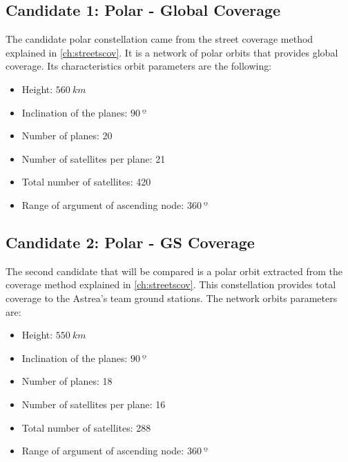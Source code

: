 

\subsection{Candidate 1: Polar - Global Coverage}

The candidate polar constellation came from the street coverage method explained in \ref{ch:streetscov}. It is a network of polar orbits that provides global coverage. Its characteristics orbit parameters are the following:

\begin{itemize}
\item Height: $560~{km}$ 
\item Inclination of the planes: $90~{º}$  
\item Number of planes: 20
\item Number of satellites per plane: 21
\item Total number of satellites: 420
\item Range of argument of ascending node: $360~{º}$ 
\end{itemize}


\subsection{Candidate 2: Polar - GS Coverage}
 
The second candidate that will be compared is a polar orbit extracted from the coverage method explained in \ref{ch:streetscov}. This constellation provides total coverage to the Astrea's team ground stations. The network orbits parameters are:

\begin{itemize}
\item Height: $550~{km}$ 
\item Inclination of the planes: $90~{º}$  
\item Number of planes: 18
\item Number of satellites per plane: 16
\item Total number of satellites: 288
\item Range of argument of ascending node: $360~{º}$ 
\end{itemize}


